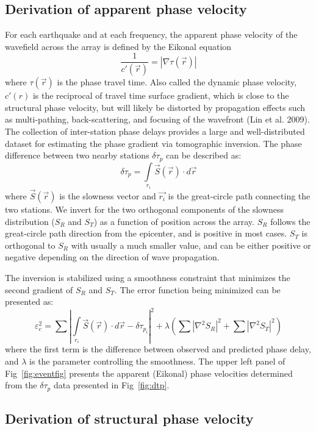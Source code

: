 \documentclass[referee]{gji}
\begin{document}
\subsection{Derivation of apparent phase velocity}
\label{sec:apv}

For each earthquake and at each frequency, the apparent phase velocity of the wavefield across the array is defined by the Eikonal equation 
\[
\frac{1}{c'(\vec{r})} = |\nabla \tau(\vec{r})|
\]
where $\tau(\vec{r})$ is the phase travel time. Also called the dynamic phase velocity, $c'(r)$ is the reciprocal of travel time surface gradient, which is close to the structural phase velocity, but will likely be distorted by propagation effects such as multi-pathing, back-scattering, and focusing of the wavefront (Lin et al. 2009).  The collection of inter-station phase delays provides a large and well-distributed dataset for estimating the phase gradient via tomographic inversion. The phase difference between two nearby stations $\delta \tau_p$ can be described as:
\[
\delta \tau_p = \int\limits_{r_i} \vec{S}(\vec{r}) \cdot d\vec{r}
\]
where $\vec{S}(\vec{r})$ is the slowness vector and $\vec{r_i}$ is the great-circle path connecting the two stations. We invert for the two orthogonal components of the slowness distribution ($S_R$ and $S_T$) as a function of position across the array. $S_R$ follows the great-circle path direction from the epicenter, and is positive in most cases. $S_T$ is orthogonal to $S_R$ with usually a much smaller value, and can be either positive or negative depending on the direction of wave propagation.

The inversion is stabilized using a smoothness constraint that minimizes the second gradient of $S_R$ and $S_T$. The error function being minimized can be presented as:
\[
\varepsilon_{c}^2 = \sum \left| \int\limits_{r_i} \vec{S}(\vec{r}) \cdot d\vec{r} - \delta \tau_{p_i}\right|^2 + \lambda \left( \sum |\nabla^2 S_R|^2 + \sum |\nabla^2 S_T|^2 \right)
\]
where the first term is the difference between observed and predicted phase delay, and $\lambda$ is the parameter controlling the smoothness. The upper left panel of Fig~\ref{fig:eventfig} presents the apparent (Eikonal) phase velocities determined from the $\delta \tau_p$ data presented in Fig~\ref{fig:dtp}.    


\subsection{Derivation of structural phase velocity}
\label{sec:ampcor}
\end{document}
